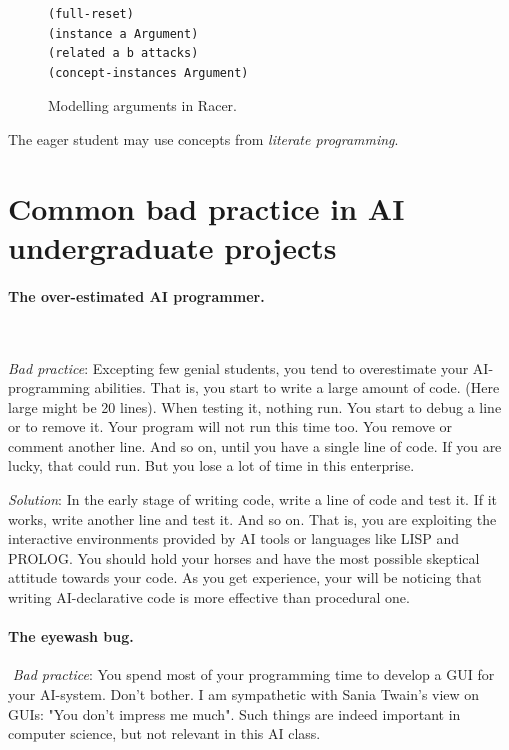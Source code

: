\documentclass[a4paper,12pt]{report}
\begin{document}
\begin{figure}
\begin{verbatim}
(full-reset)
(instance a Argument)
(related a b attacks)
(concept-instances Argument) 
\end{verbatim}
\caption{Modelling arguments in Racer.}
\label{fig:code} 
\end{figure}

The eager student may use concepts from \textit{literate programming}.

\section{Common bad practice in AI undergraduate projects}

\paragraph{The over-estimated AI programmer.} $ $

{\it Bad practice}: Excepting few genial students, you tend to overestimate your AI-programming abilities. 
That is, you start to write a large amount of code. (Here large might be 20 lines).
When testing it, nothing run. 
You start to debug a line or to remove it.
Your program will not run this time too. 
You remove or comment another line. 
And so on, until you have a single line of code.
If you are lucky, that could run. 
But you lose a lot of time in this enterprise.

{\it Solution}: In the early stage of writing code, write a line of code and test it. 
If it works, write another line and test it. 
And so on. 
That is, you are exploiting the interactive environments provided by 
AI tools or languages like LISP and PROLOG.
You should hold your horses and 
have the most possible skeptical attitude towards your code.  
As you get experience, your will be noticing that writing 
AI-declarative code is more effective than procedural one.  


\paragraph{The eyewash bug.} $ $
{\it Bad practice}: You spend most of your programming time to develop a GUI for your AI-system. 
Don't bother. I am sympathetic with Sania Twain's view on GUIs: "You don't impress me much".
Such things are indeed important in computer science, but not relevant in this AI class.


\end{document}
